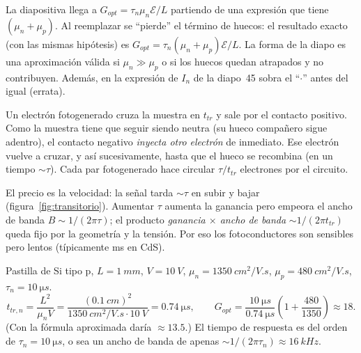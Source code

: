 \begin{ojo}[\diapo{46}]
La diapositiva llega a $G_{opt}=\tau_n\mu_n\mathcal{E}/L$ partiendo de una expresión que
tiene $(\mu_n+\mu_p)$. Al reemplazar se ``pierde'' el término de huecos: el resultado
exacto (con las mismas hipótesis) es $G_{opt}=\tau_n(\mu_n+\mu_p)\mathcal{E}/L$. La forma
de la diapo es una aproximación válida si $\mu_n\gg\mu_p$ o si los huecos quedan atrapados
y no contribuyen. Además, en la expresión de $I_n$ de la diapo~45 sobra el ``$\cdot$'' antes
del igual (errata).
\end{ojo}

\begin{intuicion}
Un electrón fotogenerado cruza la muestra en $t_{tr}$ y sale por el contacto positivo.
Como la muestra tiene que seguir siendo neutra (su hueco compañero sigue adentro), el
contacto negativo \emph{inyecta otro electrón} de inmediato. Ese electrón vuelve a cruzar,
y así sucesivamente, hasta que el hueco se recombina (en un tiempo $\sim\tau$). Cada par
fotogenerado hace circular $\tau/t_{tr}$ electrones por el circuito.

El precio es la velocidad: la señal tarda $\sim\tau$ en subir y bajar
(figura~\ref{fig:transitorio}). Aumentar $\tau$ aumenta la ganancia pero empeora el ancho
de banda $B\sim1/(2\pi\tau)$; el producto \emph{ganancia $\times$ ancho de banda}
$\sim 1/(2\pi t_{tr})$ queda fijo por la geometría y la tensión. Por eso los
fotoconductores son sensibles pero lentos (típicamente ms en CdS).
\end{intuicion}

\begin{ejemplo}
Pastilla de Si tipo p, $L=\SI{1}{mm}$, $V=\SI{10}{V}$, $\mu_n=\SI{1350}{cm^2/V.s}$,
$\mu_p=\SI{480}{cm^2/V.s}$, $\tau_n=\SI{10}{\micro s}$.
\[
  t_{tr,n}=\frac{L^2}{\mu_n V}=\frac{(\SI{0.1}{cm})^2}{\SI{1350}{cm^2/V.s}\cdot\SI{10}{V}}
  =\SI{0.74}{\micro s},
  \qquad
  G_{opt}=\frac{\SI{10}{\micro s}}{\SI{0.74}{\micro s}}\left(1+\frac{480}{1350}\right)\approx 18 .
\]
(Con la fórmula aproximada daría $\approx13.5$.) El tiempo de respuesta es del orden de
$\tau_n=\SI{10}{\micro s}$, o sea un ancho de banda de apenas
$\sim1/(2\pi\tau_n)\approx\SI{16}{kHz}$.
\end{ejemplo}
